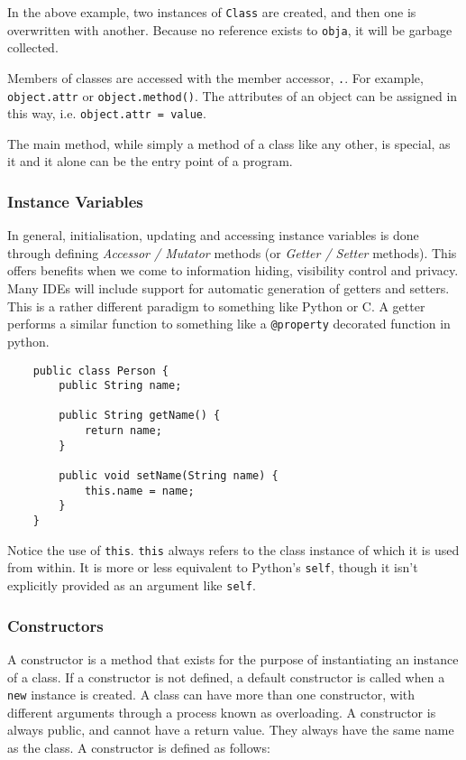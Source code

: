 \documentclass[12pt]{report}
\newcommand{\code}[1]{\lstinline{#1}}
\begin{document}
\begin{flushleft}
In the above example, two instances of \code{Class} are created, and then one
is overwritten with another. Because no reference exists to \code{obja}, it 
will be garbage collected. \par
Members of classes are accessed with the member accessor, \code{.}. For 
example, \code{object.attr} or \code{object.method()}. The attributes of an
object can be assigned in this way, i.e. \code{object.attr = value}.

\bigskip
The main method, while simply a method of a class like any other, is special, 
as it and it alone can be the entry point of a program.

\subsubsection*{Instance Variables}

In general, initialisation, updating and accessing instance variables is done
through defining \textit{Accessor / Mutator} methods (or 
\textit{Getter / Setter} methods). This offers benefits when we come to 
information hiding, visibility control and privacy. Many IDEs will include 
support for automatic generation of getters and setters. This is a rather 
different paradigm to something like Python or C. A getter performs a similar
function to something like a \code{@property} decorated function in python.

\begin{lstlisting}
    public class Person {
        public String name;

        public String getName() {
            return name;
        }

        public void setName(String name) {
            this.name = name;
        }
    }
\end{lstlisting}

Notice the use of \code{this}. \code{this} always refers to the class instance
of which it is used from within. It is more or less equivalent to Python's 
\code{self}, though it isn't explicitly provided as an argument like 
\code{self}.

\subsubsection*{Constructors}

A constructor is a method that exists for the purpose of instantiating an 
instance of a class. If a constructor is not defined, a default constructor
is called when a \code{new} instance is created. A class can have more than
one constructor, with different arguments through a process known as 
overloading. A constructor is always public, and cannot have a return value.
They always have the same name as the class. A constructor is defined as 
follows:


\end{flushleft}
\end{document}
